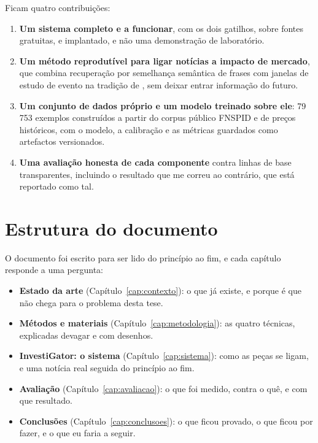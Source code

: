 Ficam quatro contribuições:

\begin{enumerate}
  \item \textbf{Um sistema completo e a funcionar}, com os dois gatilhos, sobre fontes gratuitas, e
        implantado, e não uma demonstração de laboratório.
  \item \textbf{Um método reprodutível para ligar notícias a impacto de mercado}, que combina
        recuperação por semelhança semântica de frases \autocite{reimers2019sbert} com janelas de
        estudo de evento na tradição de \textcite{brown1985daily}, sem deixar entrar informação do
        futuro.
  \item \textbf{Um conjunto de dados próprio e um modelo treinado sobre ele}: 79\,753 exemplos
        construídos a partir do corpus público \gls{FNSPID} \autocite{dong2024fnspid} e de preços
        históricos, com o modelo, a calibração e as métricas guardados como artefactos versionados.
  \item \textbf{Uma avaliação honesta de cada componente} contra linhas de base transparentes,
        incluindo o resultado que me correu ao contrário, que está reportado como tal.
\end{enumerate}

\section{Estrutura do documento}
\label{sec:intro_estrutura}

O documento foi escrito para ser lido do princípio ao fim, e cada capítulo responde a uma pergunta:

\begin{itemize}
  \item \textbf{Estado da arte} (Capítulo~\ref{cap:contexto}): o que já existe, e porque é que não
        chega para o problema desta tese.
  \item \textbf{Métodos e materiais} (Capítulo~\ref{cap:metodologia}): as quatro técnicas, explicadas
        devagar e com desenhos.
  \item \textbf{InvestiGator: o sistema} (Capítulo~\ref{cap:sistema}): como as peças se ligam, e uma notícia
        real seguida do princípio ao fim.
  \item \textbf{Avaliação} (Capítulo~\ref{cap:avaliacao}): o que foi medido, contra o quê, e com
        que resultado.
  \item \textbf{Conclusões} (Capítulo~\ref{cap:conclusoes}): o que ficou provado, o que ficou por
        fazer, e o que eu faria a seguir.
\end{itemize}

